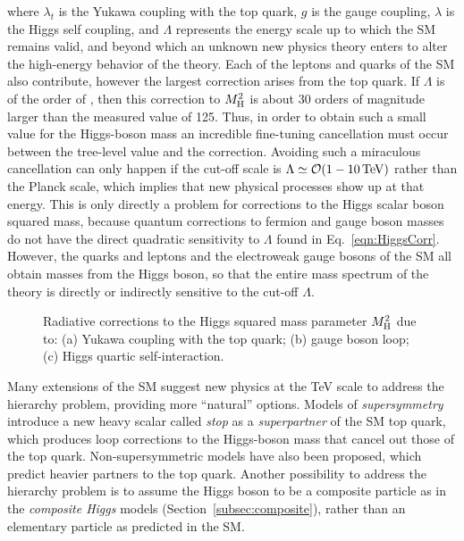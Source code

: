 \noindent where $\lambda_t$ is the Yukawa coupling with the top quark, $g$ is the gauge coupling, $\lambda$ is the Higgs self coupling, and $\Lambda$ represents the energy scale up to which the SM remains valid, and beyond which an unknown new physics theory enters to alter the high-energy behavior of the theory.
Each of the leptons and quarks of the SM also contribute, however the largest correction arises from the top quark.
If $\Lambda$ is of the order of \MPl, then this correction to $M^2_\mathrm{H}$ is about 30 orders of magnitude larger than the measured value of 125\GeV.
Thus, in order to obtain such a small value for the Higgs-boson mass an incredible fine-tuning cancellation must occur between the tree-level value and the correction.
Avoiding such a miraculous cancellation can only happen if the cut-off scale is $\Lambda \simeq \mathcal{O}(1 - 10\,\text{Te\hspace{-.08em}V})$ rather than the Planck scale, which implies that new physical processes show up at that energy.
This is only directly a problem for corrections to the Higgs scalar boson squared mass, because quantum corrections to fermion and gauge boson masses do not have the direct
quadratic sensitivity to $\Lambda$ found in Eq.~\ref{eqn:HiggsCorr}. However, the quarks and leptons and the electroweak gauge bosons of the SM all obtain masses from the Higgs boson,
so that the entire mass spectrum of the theory is directly or indirectly sensitive to the cut-off $\Lambda$.

\begin{figure}[!htb]
 \centering
 \caption{Radiative corrections to the Higgs squared mass parameter $M^2_\mathrm{H}$ due to: (a) Yukawa coupling with the top quark; (b) gauge boson loop; (c) Higgs quartic self-interaction.}
 \label{fig:HiggsLoop}
\end{figure}

Many extensions of the SM suggest new physics at the TeV scale to address the hierarchy problem, providing more ``natural'' options.
Models of \textit{supersymmetry}~\cite{PhysRevD.24.1681,Casas:1994qy} introduce a new heavy scalar called \textit{stop} as a \textit{superpartner} of the SM top quark,
which produces loop corrections to the Higgs-boson mass that cancel out those of the top quark.
Non-supersymmetric models have also been proposed, which predict heavier partners to the top quark.
Another possibility to address the hierarchy problem is to assume the Higgs boson to be a composite particle as in the \textit{composite Higgs} models (Section~\ref{subsec:composite}),
rather than an elementary particle as predicted in the SM. %

